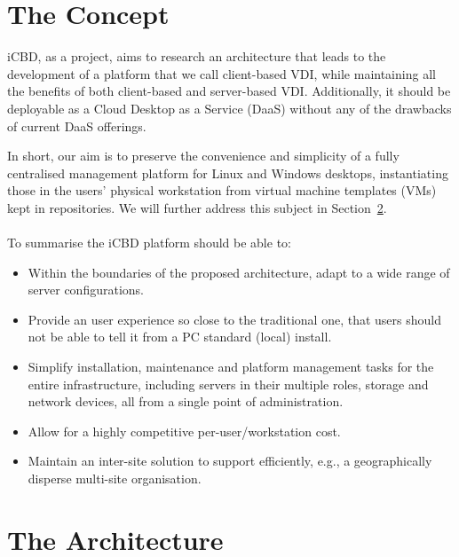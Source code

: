 \section{The Concept} %
\label{sec:icbd_concept}

iCBD, as a project, aims to research an architecture that leads to the development of a platform that we call client-based VDI, while maintaining all the benefits of both client-based and server-based VDI. Additionally, it should be deployable as a Cloud Desktop as a Service (DaaS) without any of the drawbacks of current DaaS offerings.

In short, our aim is to preserve the convenience and simplicity of a fully centralised management
platform for Linux and Windows desktops, instantiating those in the users' physical workstation from virtual machine templates (VMs) kept in repositories. We will further address this subject in Section~\ref{sec:icbd_architecture}.
\\
\\
To summarise the iCBD platform should be able to:

\begin{itemize}
	\item Within the boundaries of the proposed architecture, adapt to a wide range of server configurations.
	\item Provide an user experience so close to the traditional one, that users should not be able to tell it from a PC standard (local) install.
	\item Simplify installation, maintenance and platform management tasks for the entire infrastructure, including servers in their multiple roles, storage and network devices, all from a single point of administration.
	\item Allow for a highly competitive per-user/workstation cost.
	\item Maintain an inter-site solution to support efficiently, e.g., a geographically disperse multi-site organisation.
\end{itemize}


\section{The Architecture} %
\label{sec:icbd_architecture}

